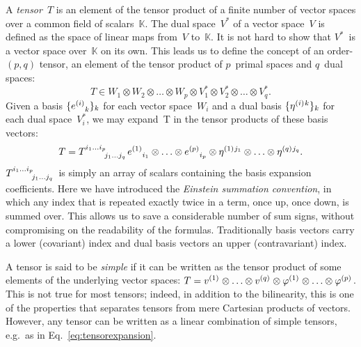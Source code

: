 \documentclass[aps,pra,12pt,nofootinbib,superscriptaddress,longbibliography]{revtex4-1}
\theoremstyle{plain}
\theoremstyle{definition}
\newcommand{\K}{{\mathbb K}}  %
\newcommand{\spidx}[3]{^{(#1)}{}\indices{^{#2}_{#3}}}
\newcommand{\bv}{e}     %
\newcommand{\dv}{\eta}  %
\newcommand{\be}{\begin{equation}}
\newcommand{\ee}{\end{equation}}
\begin{document}
A \emph{tensor}~$T$ is an element of the tensor product of a finite
number of vector spaces over a common field of scalars~$\K$.
The dual space~$V^*$ of a vector space~$V$ is defined as the space of
linear maps from~$V$ to~$\K$. It is not hard to show that $V^*$~is a
vector space over~$\K$ on its own. This leads us to define
the concept of an order-$(p,q)$ tensor, an element of the tensor product
of $p$~primal spaces and $q$~dual spaces:
\be
T \in W_1 \otimes W_2 \otimes \ldots \otimes W_p \otimes V_1^* \otimes V_2^* \otimes \ldots \otimes V_q^*.
\ee
Given a basis $\{\bv\spidx{i}{}{k}\}_k$ for each vector
space~$W_i$ and a dual basis $\{\dv\spidx{i}{k}{}\}_k$ for each dual space~$V_i^*$,
we may expand~T in the tensor products of these basis vectors:
\be
\label{eq:tensorexpansion}
T = T\indices{^{i_1 \ldots i_p}_{j_1 \ldots j_q}}
\bv\spidx{1}{}{i_1} \otimes \ldots \otimes \bv\spidx{p}{}{i_p}
\otimes
\dv\spidx{1}{j_1}{} \otimes \ldots \otimes \dv\spidx{q}{j_q}{}.
\ee
$T\indices{^{i_1 \ldots i_p}_{j_1 \ldots j_q}}$ is simply an array of
scalars containing the basis expansion coefficients.
Here we have introduced the \emph{Einstein summation convention}, in which
any index that is repeated exactly twice in a term, once up, once
down, is summed over. This allows us to save a considerable number of
sum signs, without compromising on the readability of the formulas.
Traditionally basis vectors carry a lower (covariant) index and dual basis vectors
an upper (contravariant) index.

A tensor is said to be \emph{simple} if it can be written as the tensor product
of some elements of the underlying vector spaces:
$T = v\spidx{1}{}{} \otimes \ldots \otimes v\spidx{q}{}{} \otimes \varphi\spidx{1}{}{} \otimes \ldots \otimes \varphi\spidx{p}{}{}$.
This is not true for most tensors; indeed, in addition to the
bilinearity, this is one of the properties that separates tensors from mere Cartesian products of vectors.
However, any tensor can be written as a linear combination of simple tensors,
e.g.~as in Eq.~\eqref{eq:tensorexpansion}.
\end{document}
